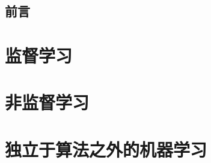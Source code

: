 \documentclass[oneside]{ctexbook}
\begin{document}
\cleardoublepage
\maketitle
\tableofcontents

\chapter*{前言}


\part{监督学习} %
\label{prt:监督学习_}
\clearpage








\part{非监督学习} %
\label{prt:非监督学习}





\part{独立于算法之外的机器学习} %
\label{prt:独立于算法之外的机器学习}



\end{document}
